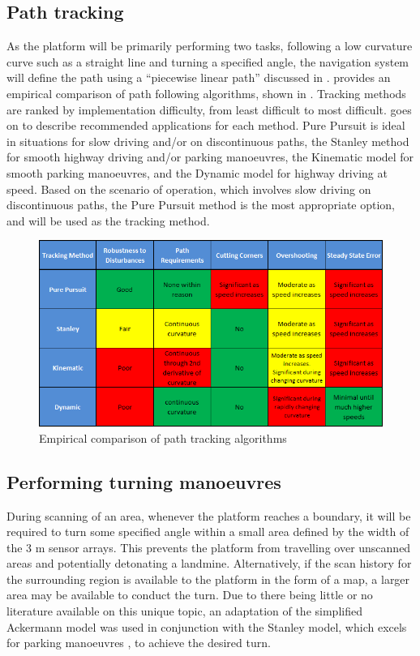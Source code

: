 \documentclass[main.tex]{subfiles}
\begin{document}
\subsection{Path tracking}
As the platform will be primarily performing two tasks, following a low curvature curve such as a straight line and turning a specified angle, the navigation system will define the path using a ``piecewise linear path'' discussed in . \Textcite{snider2009} provides an empirical comparison of path following algorithms, shown in . Tracking methods are ranked by implementation difficulty, from least difficult to most difficult. \Textcite{snider2009} goes on to describe recommended applications for each method. Pure Pursuit is ideal in situations for slow driving and/or on discontinuous paths, the Stanley method for smooth highway driving and/or parking manoeuvres, the Kinematic model for smooth parking manoeuvres, and the Dynamic model for highway driving at speed. Based on the scenario of operation, which involves slow driving on discontinuous paths, the Pure Pursuit method is the most appropriate option, and will be used as the tracking method.
\begin{figure}[ht]
\includegraphics[width = \textwidth]{3-ConceptDesign/pathTrackingSummary2.png}
\centering
\caption[Empirical comparison of path tracking algorithms]{Empirical comparison of path tracking algorithms \parencite{snider2009}} 
\end{figure}

\subsection{Performing turning manoeuvres}
During scanning of an area, whenever the platform reaches a boundary, it will be required to turn some specified angle within a small area defined by the width of the 3 m sensor arrays. This prevents the platform from travelling over unscanned areas and potentially detonating a landmine. Alternatively, if the scan history for the surrounding region is available to the platform in the form of a map, a larger area may be available to conduct the turn. Due to there being little or no literature available on this unique topic, an adaptation of the simplified Ackermann model was used in conjunction with the Stanley model, which excels for parking manoeuvres \parencite{snider2009}, to achieve the desired turn.
\end{document}
